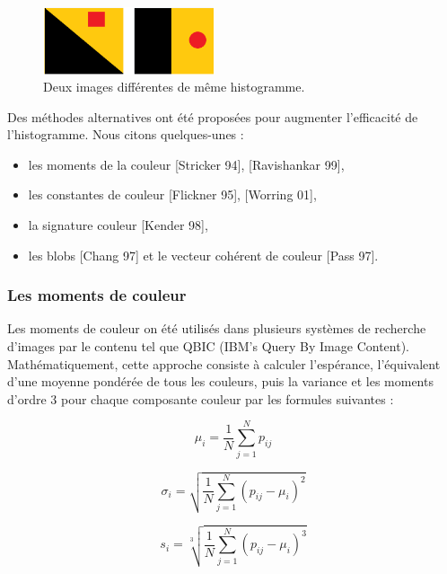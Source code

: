 \begin{figure}[H]
	\label{fig:samehist}
	\centering
	\includegraphics[width=0.45\textwidth]{Figures/sameHist} %
	\caption{Deux images différentes de même histogramme.}
\end{figure}

Des méthodes alternatives ont été proposées pour augmenter l'efficacité de l'histogramme. Nous citons quelques-unes : 
\begin{itemize}
	\item les moments de la couleur [Stricker 94], [Ravishankar 99],
	\item les constantes de couleur [Flickner 95], [Worring 01],
	\item la signature couleur [Kender 98], 
	\item les blobs [Chang 97] et le vecteur cohérent de couleur [Pass 97].
\end{itemize}


\subsubsection{Les moments de couleur}
Les moments de couleur on été utilisés dans plusieurs systèmes de recherche d’images par le contenu tel que QBIC (IBM's Query By Image Content). Mathématiquement, cette approche consiste à calculer l’espérance, l’équivalent d’une moyenne pondérée de tous les couleurs, puis la variance et les moments d’ordre 3 pour chaque composante couleur par les formules suivantes :

\begin{equation}
	\mu_i = \frac{1}{N} \sum_{j=1}^{N} p_{ij}
\end{equation}

\begin{equation}
	\sigma_i = \sqrt{\frac{1}{N} \sum_{j=1}^{N} (p_{ij}-\mu_i)^2}
\end{equation}

\begin{equation}
	s_i = \sqrt[3]{\frac{1}{N} \sum_{j=1}^{N} (p_{ij}-\mu_i)^3}
\end{equation}

